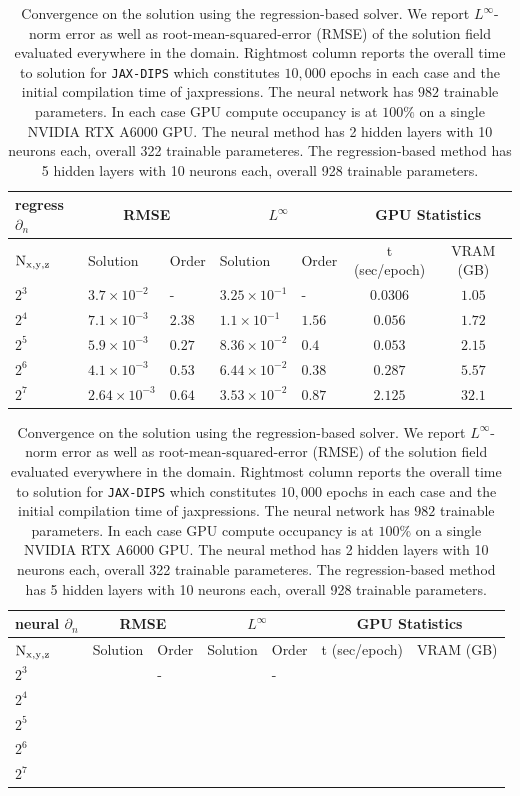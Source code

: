 \documentclass{elsarticle}
\begin{document}
\begin{table}[ht]
\begin{center}
\begin{tabular}{|l||ll|ll|c|c|}
\hline
regress $\partial_n$ & \multicolumn{2}{c|}{RMSE}& \multicolumn{2}{c|}{$L^\infty$} & \multicolumn{2}{c|}{GPU Statistics} \\
\hline
$\rm N_{x,y,z}$   &   Solution    &   Order   &   Solution   &   Order & t (sec/epoch) & VRAM (GB)\\
\hline 
$2^3$ & $3.7\times 10^{-2}$ &  -        & $3.25\times 10^{-1}$  &   -     & $0.0306$ & $1.05$ \\
$2^4$ & $7.1\times 10^{-3}$ &  $2.38$   & $1.1\times 10^{-1}$   & $1.56$  & $0.056$  & $1.72$ \\ 
$2^5$ & $5.9\times 10^{-3}$ &  $0.27$   & $8.36 \times 10^{-2}$ & $0.4$   & $0.053$  & $2.15$ \\ 
$2^6$ & $4.1\times 10^{-3}$ &  $0.53$   & $6.44\times 10^{-2}$  & $0.38$  & $0.287$  & $5.57$ \\ 
$2^7$ & $2.64\times 10^{-3}$&  $0.64$   & $3.53\times 10^{-2}$  & $0.87$  & $2.125$ & $32.1$ \\ \hline
\end{tabular}
\begin{tabular}{|l||ll|ll|c|c|}
\hline
neural $\partial_n$ & \multicolumn{2}{c|}{RMSE}& \multicolumn{2}{c|}{$L^\infty$} & \multicolumn{2}{c|}{GPU Statistics} \\
\hline
$\rm N_{x,y,z}$   &   Solution    &   Order   &   Solution   &   Order & t (sec/epoch) & VRAM (GB)\\
\hline 
$2^3$ & $ $ &  -     & $ $  &   -   & $ $ & $ $ \\
$2^4$ & $ $ &  $ $   & $ $  & $ $   & $ $ & $ $ \\ 
$2^5$ & $ $ &  $ $   & $ $  & $ $   & $ $ & $ $ \\ 
$2^6$ & $ $ &  $ $   & $ $  & $ $   & $ $ & $ $ \\ 
$2^7$ & $ $ &  $ $   & $ $  & $ $   & $ $ & $ $ \\ \hline
\end{tabular}
\caption{Convergence on the solution using the regression-based solver. We report $L^\infty$-norm error as well as root-mean-squared-error (RMSE) of the solution field evaluated everywhere in the domain. Rightmost column reports the overall time to solution for \texttt{JAX-DIPS} which constitutes $10,000$ epochs in each case and the initial compilation time of jaxpressions. The neural network has $982$ trainable parameters. In each case GPU compute occupancy is at $100\%$ on a single NVIDIA RTX A6000 GPU. The neural method has 2 hidden layers with 10 neurons each, overall 322 trainable parameteres. The regression-based method has 5 hidden layers with 10 neurons each, overall 928 trainable parameters.}
\end{center}
\end{table}
\end{document}
